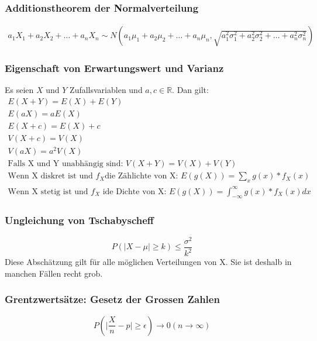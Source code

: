\documentclass[landscape,twocolumn,a4paper]{article}
\newcommand{\RN}{\mathbb{R}} %
\begin{document}
\subsubsection*{Additionstheorem der Normalverteilung}
\begin{align*}
a_1X_1 + a_2X_2 + \dots + a_nX_n \sim N(a_1\mu_1 + a_2\mu_2 + \dots + a_n\mu_n, \sqrt {a_1^2 \sigma_1^2 + a_2^2 \sigma_2^2 +\dots + a_n^2 \sigma_n^2})
\end{align*}
\subsubsection*{Eigenschaft von Erwartungswert und Varianz}
Es seien $X$ und $Y$  Zufallsvariablen und $a, c \in \RN$.
Dan gilt:
\begin{align*}
E(X + Y) = E(X) + E(Y) \\
E(aX) = aE(X) \\
E(X + c) = E(X) + c\\
V(X + c) = V(X)\\
V(aX) = a^2V(X)\\
\text{Falls X und Y unabhängig sind: } V(X + Y) = V(X) + V(Y) \\
\text{Wenn X diskret ist und } f_X \text{die Zählichte von X: } E(g(X)) = \sum_x g(x) * f_X(x) \\
\text{Wenn X stetig ist und } f_X \text{ ide Dichte von X: } E(g(X)) = \int_{-\infty}^\infty g(x) * f_X(x) dx
\end{align*}

\subsubsection*{Ungleichung von Tschabyscheff}
\begin{equation*}
P(\mid X - \mu \mid \geq k) \leq \frac{\sigma^2}{k^2}
\end{equation*}
Diese Abschätzung gilt für alle möglichen Verteilungen von X. Sie ist deshalb in manchen Fällen recht grob.

\subsubsection*{Grentzwertsätze: Gesetz der Grossen Zahlen}
\begin{equation*}
P(\mid \frac{X}{n} - p \mid \geq \epsilon) \rightarrow 0 (n \rightarrow \infty)
\end{equation*}
\end{document}
